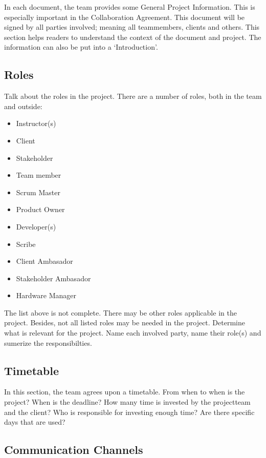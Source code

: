 \documentclass[10pt]{report}
\begin{document}
In each document, the team provides some General Project Information. This is especially important in the Collaboration Agreement. This document will be signed by all parties involved; meaning all teammembers, clients and others. This section helps readers to understand the context of the document and project. The information can also be put into a `Introduction'.

\subsection{Roles}

Talk about the roles in the project. There are a number of roles, both in the team and outside:

\begin{itemize}
	\item Instructor(s)
	\item Client
	\item Stakeholder
	\item Team member
	\item Scrum Master
	\item Product Owner
	\item Developer(s)
	\item Scribe
	\item Client Ambasador
	\item Stakeholder Ambasador
	\item Hardware Manager
\end{itemize}

The list above is not complete. There may be other roles applicable in the project. Besides, not all listed roles may be needed in the project. Determine what is relevant for the project. Name each involved party, name their role(s) and sumerize the responsibilties.

\subsection{Timetable}

In this section, the team agrees upon a timetable. From when to when is the project? When is the deadline? How many time is invested by the projectteam and the client? Who is responsible for investing enough time? Are there specific days that are used?

\subsection{Communication Channels}
\end{document}
